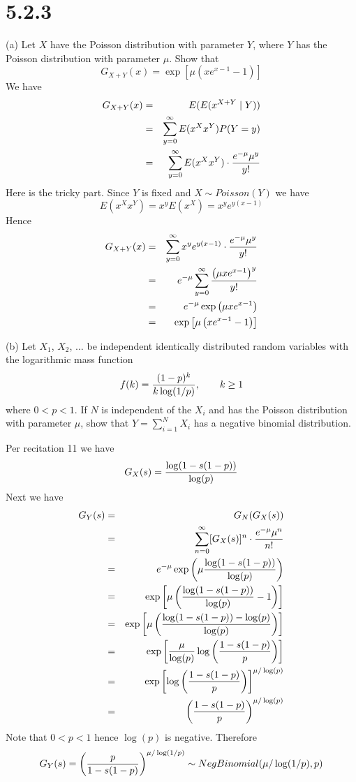 \section*{5.2.3}
(a) Let $X$ have the Poisson distribution with parameter $Y$,
where $Y$ has the Poisson distribution with parameter $\mu$.
Show that
$$G_{X+Y}(x)=\exp\left[\mu\left(xe^{x-1}-1\right)\right]$$
We have
\begin{eqnarray*}
G_{X+Y}(x)&=&E(E(x^{X+Y}\mid Y))\\
&=&\sum_{y=0}^\infty E(x^Xx^Y)P(Y=y)\\
&=&\sum_{y=0}^\infty E(x^Xx^Y)\cdot{e^{-\mu}\mu^y\over y!}
\end{eqnarray*}
Here is the tricky part. Since $Y$ is fixed and $X\sim Poisson(Y)$
we have
$$E(x^Xx^Y)=x^yE(x^X)=x^ye^{y(x-1)}$$
Hence
\begin{eqnarray*}
G_{X+Y}(x)&=&\sum_{y=0}^\infty x^ye^{y(x-1)}\cdot
{e^{-\mu}\mu^y\over y!}\\
&=&e^{-\mu}\sum_{y=0}^\infty{\left(\mu xe^{x-1}\right)^y\over y!}\\
&=&e^{-\mu}\exp\left(\mu xe^{x-1}\right)\\
&=&\exp\left[\mu\left(xe^{x-1}-1\right)\right]
\end{eqnarray*}

\bigskip
\noindent
(b) Let $X_1$, $X_2$, $\ldots$ be independent identically distributed
random variables with the logarithmic mass function
$$f(k)={(1-p)^k\over k\log(1/p)},\qquad k\ge1$$
where $0<p<1$. If $N$ is independent of the $X_i$ and has the
Poisson distribution with parameter $\mu$, show that
$Y=\sum_{i=1}^NX_i$ has a negative binomial distribution.

\bigskip
\noindent
Per recitation 11 we have
$$G_X(s)={\log(1-s(1-p))\over\log(p)}$$
Next we have
\begin{eqnarray*}
G_Y(s)&=&G_N(G_X(s))\\
&=&\sum_{n=0}^\infty[G_X(s)]^n\cdot{e^{-\mu}\mu^n\over n!}\\
&=&e^{-\mu}\exp\left(\mu
{\log(1-s(1-p))\over\log(p)}\right)\\
&=&\exp\left[\mu\left(
{\log(1-s(1-p))\over\log(p)}-1\right)\right]\\
&=&\exp\left[\mu\left(
{\log(1-s(1-p))-\log(p)\over\log(p)}\right)\right]\\
&=&\exp\left[
{\mu\over\log(p)}
\log\left(
{1-s(1-p)\over p}
\right)\right]\\
&=&\exp\left[
\log\left(
{1-s(1-p)\over p}
\right)\right]^{\mu/\log(p)}\\
&=&\left(
{1-s(1-p)\over p}
\right)^{\mu/\log(p)}
\end{eqnarray*}
Note that $0<p<1$ hence $\log(p)$ is negative. Therefore
$$G_Y(s)=\left(
{p\over1-s(1-p)}\right)^{\mu/\log(1/p)}
\sim NegBinomial(\mu/\log(1/p),p)$$
